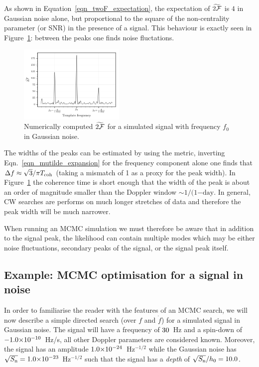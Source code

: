 \documentclass[aps, prd, twocolumn, superscriptaddress, floatfix, showpacs, nofootinbib, longbibliography]{revtex4-1}
\begin{document}
As shown in Equation~\eqref{eqn_twoF_expectation}, the expectation of
$\widetilde{2{\mathcal{F}}}$ is $4$ in Gaussian noise alone, but proportional to the
square of the non-centrality parameter (or SNR) in the presence of a signal.
This behaviour is exactly seen in Figure~\ref{fig_grid_frequency}: between the
peaks one finds noise fluctations.

\begin{figure}[htb]
\centering \includegraphics[width=0.45\textwidth]{grided_frequency_search_1D}
\caption{Numerically computed $\widetilde{2{\mathcal{F}}}$ for a
simulated signal with frequency $f_0$ in Gaussian noise.}
\label{fig_grid_frequency}
\end{figure}

The widths of the peaks can be estimated by using the metric, inverting
Eqn.~\ref{eqn_mutilde_expansion} for the frequency component alone one finds
that $\Delta f \approx \sqrt{3}/{\pi T_{\rm coh}}$ (taking a mismatch of 1 as a proxy
for the peak width). In Figure~\ref{fig_grid_frequency} the coherence time is
short enough that the width of the peak is about an order of magnitude smaller
than the Doppler window $\sim 1/(1\mathrm{-day}$. In general, CW searches are
performs on much longer stretches of data and therefore the peak width will
be much narrower.

When running an MCMC simulation we must therefore be aware that in addition to
the signal peak, the likelihood can contain multiple modes which may be either
noise fluctuations, secondary peaks of the signal, or the signal peak itself.


\subsection{Example: MCMC optimisation for a signal in noise}

In order to familiarise the reader with the features of an MCMC search, we will
now describe a simple directed search (over $f$ and $\dot{f}$) for a simulated
signal in Gaussian noise. The signal will have a frequency of
$30$~Hz and a spin-down of $-1.0{\times}10^{-10}$~Hz/s, all other
Doppler parameters are considered known. Moreover, the signal has an amplitude
$1.0{\times}10^{-24}$~Hz$^{-1/2}$ while the Gaussian noise has
$\sqrt{S_{\rm n}}=1.0{\times}10^{-23}$~Hz$^{-1/2}$ such that the signal has a
\emph{depth} of $\sqrt{S_{\rm n}}/h_0 = 10.0$.
\end{document}
